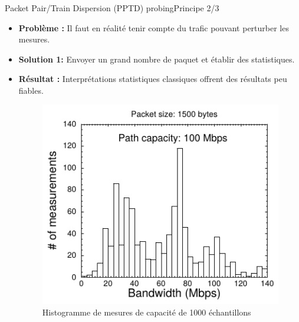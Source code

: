 \documentclass[compress]{beamer}
\begin{document}
\begin{frame}{Packet Pair/Train Dispersion (PPTD) probing}{Principe 2/3}
\begin{itemize}
	\item \textbf{Problème :} Il faut en réalité tenir compte du {\color{red}trafic} pouvant {\color{red}perturber} les mesures.
	\pause
	\item \textbf{Solution 1:} Envoyer un {\color{red}grand nombre} de paquet et établir des statistiques.
	\item \textbf{Résultat :} Interprétations statistiques classiques offrent des résultats peu fiables. 
	\begin{figure}[hbtp]
		\centering
		\includegraphics[scale=0.4]{schema6.png}
		\caption{Histogramme de mesures de capacité de 1000 échantillons}
	\end{figure}
\end{itemize}
\end{frame}

\end{document}
